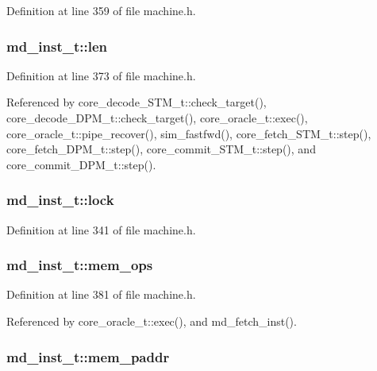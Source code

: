 Definition at line 359 of file machine.h.
\subsubsection[{len}]{ {\bf md\_\-inst\_\-t::len}}\label{structmd__inst__t_5dad80b28e8ae15c2bd387663d32fb7e}




Definition at line 373 of file machine.h.

Referenced by core\_\-decode\_\-STM\_\-t::check\_\-target(), core\_\-decode\_\-DPM\_\-t::check\_\-target(), core\_\-oracle\_\-t::exec(), core\_\-oracle\_\-t::pipe\_\-recover(), sim\_\-fastfwd(), core\_\-fetch\_\-STM\_\-t::step(), core\_\-fetch\_\-DPM\_\-t::step(), core\_\-commit\_\-STM\_\-t::step(), and core\_\-commit\_\-DPM\_\-t::step().
\subsubsection[{lock}]{ {\bf md\_\-inst\_\-t::lock}}\label{structmd__inst__t_306877762a28496836a56442420ddcbf}




Definition at line 341 of file machine.h.
\subsubsection[{mem\_\-ops}]{ {\bf md\_\-inst\_\-t::mem\_\-ops}}\label{structmd__inst__t_7d4fdf56674234c3dd7ad29c61bd6636}




Definition at line 381 of file machine.h.

Referenced by core\_\-oracle\_\-t::exec(), and md\_\-fetch\_\-inst().
\subsubsection[{mem\_\-paddr}]{ {\bf md\_\-inst\_\-t::mem\_\-paddr}}\label{structmd__inst__t_fed221efd36b737217220c9c44cf8e99}





